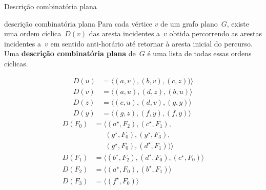 \documentclass{IFES-beamer}
\newcommand{\defi}[1]{\textbf{#1}} %
\begin{document}
\begin{frame}{Descrição combinatória plana}
\begin{block}{descrição combinatória plana}
Para cada vértice $v$ de um grafo plano~$G$, existe uma ordem cíclica~$D(v)$ das aresta incidentes a~$v$ obtida percorrendo as arestas incidentes a~$v$ em sentido anti-horário até retornar à aresta inicial do percurso.
Uma \defi{descrição combinatória plana} de~$G$ é uma lista de todas essas ordens cíclicas.
\end{block}
\begin{minipage}[H]{0.1\textwidth}
\begin{align*}
D(u)&=\langle (a,v), (b,v), (c,z))\rangle\\
D(v)&=\langle (a,u), (d,z), (b,u)  \rangle\\
D(z)&=\langle (c,u), (d,v), (g,y) \rangle \\
D(y)&=\langle (g,z), (f,y), (f,y) \rangle
\end{align*}
\begin{align*}
D(F_0)&=\langle (a^\star, F_2), (c^\star, F_1), \\
      &~~~~~~~(g^\star, F_0), (y^\star, F_3), \\
      &~~~~~~~(g^\star, F_0), (d^\star, F_1) )\rangle\\
D(F_1)&=\langle (b^\star, F_2), (d^\star, F_0), (c^\star, F_0)  \rangle\\
D(F_2)&=\langle (a^\star, F_0), (b^\star, F_1)\rangle \\
D(F_3)&=\langle (f^\star, F_0)\rangle
\end{align*}
\end{minipage}
\hspace{-1cm}
\begin{minipage}[H]{0.4\textwidth}
\begin{figure}[H]
\scalebox{1.2}{
\centering

}
\label{fig:MSF-basico-1}
\end{figure}
\end{minipage}
\end{frame}
\end{document}
